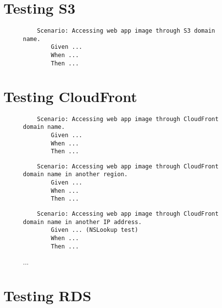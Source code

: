 \section{Testing S3}\label{sec:testing-s3}

\begin{figure}[!htbp]
    \centering
    \begin{verbatim}
    Scenario: Accessing web app image through S3 domain name.
        Given ...
        When ...
        Then ...
    \end{verbatim}
    \label{fig:accessing-image-s3}
\end{figure}

\section{Testing CloudFront}\label{sec:testing-cloudfront}

\begin{figure}[!htbp]
    \centering
    \begin{verbatim}
    Scenario: Accessing web app image through CloudFront domain name.
        Given ...
        When ...
        Then ...
    \end{verbatim}
    \label{fig:accessing-image-cloudfront}
\end{figure}

\begin{figure}[!htbp]
    \centering
    \begin{verbatim}
    Scenario: Accessing web app image through CloudFront domain name in another region.
        Given ...
        When ...
        Then ...
    \end{verbatim}
    \label{fig:accessing-image-cloudfront-diff-region}
\end{figure}

\begin{figure}[!htbp]
    \centering
    \begin{verbatim}
    Scenario: Accessing web app image through CloudFront domain name in another IP address.
        Given ... (NSLookup test)
        When ...
        Then ...
    \end{verbatim}
    \caption{...}\label{fig:accessing-image-cloudfront-diff-ip}
\end{figure}

\section{Testing RDS}\label{sec:testing-rds}

